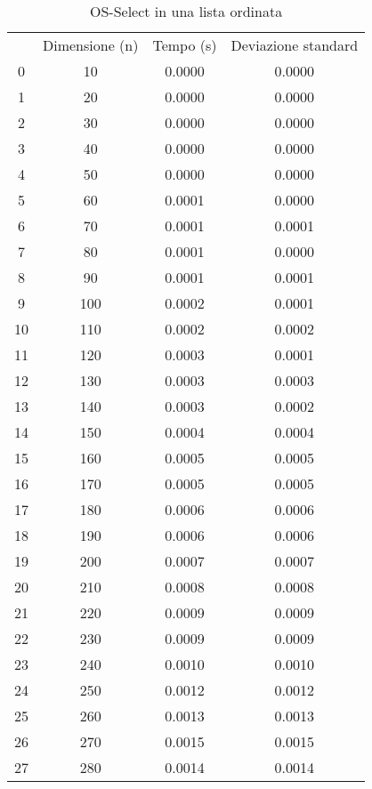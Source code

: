 \begin{table}
\centering
\caption{OS-Select in una lista ordinata}
\label{OS-Select in una lista ordinata}
\begin{adjustbox}{width=1\textwidth/2}
\begin{tabular}{|c|c|c|c|}
\hline
 & Dimensione (n) & Tempo (s) & Deviazione standard \\
0 & 10 & 0.0000 & 0.0000 \\
\cline{1-4}
1 & 20 & 0.0000 & 0.0000 \\
\cline{1-4}
2 & 30 & 0.0000 & 0.0000 \\
\cline{1-4}
3 & 40 & 0.0000 & 0.0000 \\
\cline{1-4}
4 & 50 & 0.0000 & 0.0000 \\
\cline{1-4}
5 & 60 & 0.0001 & 0.0000 \\
\cline{1-4}
6 & 70 & 0.0001 & 0.0001 \\
\cline{1-4}
7 & 80 & 0.0001 & 0.0000 \\
\cline{1-4}
8 & 90 & 0.0001 & 0.0001 \\
\cline{1-4}
9 & 100 & 0.0002 & 0.0001 \\
\cline{1-4}
10 & 110 & 0.0002 & 0.0002 \\
\cline{1-4}
11 & 120 & 0.0003 & 0.0001 \\
\cline{1-4}
12 & 130 & 0.0003 & 0.0003 \\
\cline{1-4}
13 & 140 & 0.0003 & 0.0002 \\
\cline{1-4}
14 & 150 & 0.0004 & 0.0004 \\
\cline{1-4}
15 & 160 & 0.0005 & 0.0005 \\
\cline{1-4}
16 & 170 & 0.0005 & 0.0005 \\
\cline{1-4}
17 & 180 & 0.0006 & 0.0006 \\
\cline{1-4}
18 & 190 & 0.0006 & 0.0006 \\
\cline{1-4}
19 & 200 & 0.0007 & 0.0007 \\
\cline{1-4}
20 & 210 & 0.0008 & 0.0008 \\
\cline{1-4}
21 & 220 & 0.0009 & 0.0009 \\
\cline{1-4}
22 & 230 & 0.0009 & 0.0009 \\
\cline{1-4}
23 & 240 & 0.0010 & 0.0010 \\
\cline{1-4}
24 & 250 & 0.0012 & 0.0012 \\
\cline{1-4}
25 & 260 & 0.0013 & 0.0013 \\
\cline{1-4}
26 & 270 & 0.0015 & 0.0015 \\
\cline{1-4}
27 & 280 & 0.0014 & 0.0014 \\

\end{tabular}
\end{adjustbox}
\end{table}
